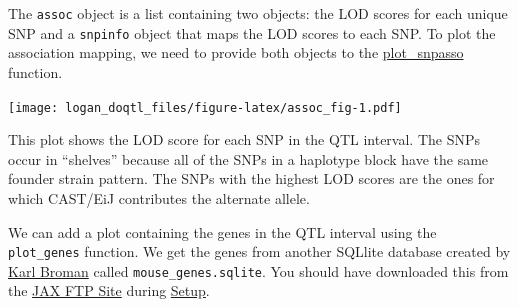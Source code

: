 \documentclass[]{article}
\newenvironment{Shaded}{\begin{snugshade}}{\end{snugshade}}
\newcommand{\KeywordTok}[1]{\textcolor[rgb]{0.13,0.29,0.53}{\textbf{#1}}}
\newcommand{\DataTypeTok}[1]{\textcolor[rgb]{0.13,0.29,0.53}{#1}}
\newcommand{\DecValTok}[1]{\textcolor[rgb]{0.00,0.00,0.81}{#1}}
\newcommand{\StringTok}[1]{\textcolor[rgb]{0.31,0.60,0.02}{#1}}
\newcommand{\OtherTok}[1]{\textcolor[rgb]{0.56,0.35,0.01}{#1}}
\newcommand{\OperatorTok}[1]{\textcolor[rgb]{0.81,0.36,0.00}{\textbf{#1}}}
\newcommand{\NormalTok}[1]{#1}
\begin{document}
\begin{Shaded}
\end{Shaded}

The \texttt{assoc} object is a list containing two objects: the LOD
scores for each unique SNP and a \texttt{snpinfo} object that maps the
LOD scores to each SNP. To plot the association mapping, we need to
provide both objects to the
\href{https://github.com/rqtl/qtl2/blob/master/R/plot_snpasso.R}{plot\_snpasso}
function.

\begin{Shaded}
\end{Shaded}

\texttt{[image: logan\_doqtl\_files/figure-latex/assoc\_fig-1.pdf]}

This plot shows the LOD score for each SNP in the QTL interval. The SNPs
occur in ``shelves'' because all of the SNPs in a haplotype block have
the same founder strain pattern. The SNPs with the highest LOD scores
are the ones for which CAST/EiJ contributes the alternate allele.

We can add a plot containing the genes in the QTL interval using the
\texttt{plot\_genes} function. We get the genes from another SQLlite
database created by \href{https://github.com/kbroman}{Karl Broman}
called \texttt{mouse\_genes.sqlite}. You should have downloaded this
from the
\href{ftp://ftp.jax.org/dgatti/CC_SNP_DB/mouse_genes.sqlite}{JAX FTP
Site} during \href{../setup.md}{Setup}.
\end{document}
